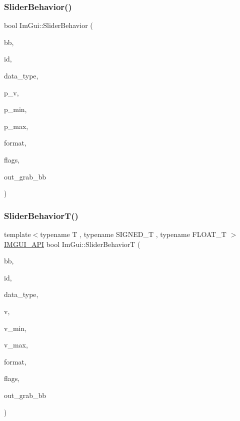 \mbox{\label{namespaceImGui_af8d5d2cfa55221448e55e51b1abcfe93}} 
\subsubsection{\texorpdfstring{Slider\+Behavior()}{SliderBehavior()}}
{\footnotesize\ttfamily bool Im\+Gui\+::\+Slider\+Behavior (\begin{DoxyParamCaption}\item[{const \hyperlink{structImRect}{Im\+Rect} \&}]{bb,  }\item[{Im\+Gui\+ID}]{id,  }\item[{Im\+Gui\+Data\+Type}]{data\+\_\+type,  }\item[{\hyperlink{imgui__impl__opengl3__loader_8h_ac668e7cffd9e2e9cfee428b9b2f34fa7}{void} $\ast$}]{p\+\_\+v,  }\item[{const \hyperlink{imgui__impl__opengl3__loader_8h_ac668e7cffd9e2e9cfee428b9b2f34fa7}{void} $\ast$}]{p\+\_\+min,  }\item[{const \hyperlink{imgui__impl__opengl3__loader_8h_ac668e7cffd9e2e9cfee428b9b2f34fa7}{void} $\ast$}]{p\+\_\+max,  }\item[{const char $\ast$}]{format,  }\item[{Im\+Gui\+Slider\+Flags}]{flags,  }\item[{\hyperlink{structImRect}{Im\+Rect} $\ast$}]{out\+\_\+grab\+\_\+bb }\end{DoxyParamCaption})}

\mbox{\label{namespaceImGui_ad0247a8c67e80cc038c1918ef3a75b80}} 
\subsubsection{\texorpdfstring{Slider\+Behavior\+T()}{SliderBehaviorT()}}
{\footnotesize\ttfamily template$<$typename T , typename S\+I\+G\+N\+E\+D\+\_\+T , typename F\+L\+O\+A\+T\+\_\+T $>$ \\
\hyperlink{imgui_8h_a43829975e84e45d1149597467a14bbf5}{I\+M\+G\+U\+I\+\_\+\+A\+PI} bool Im\+Gui\+::\+Slider\+BehaviorT (\begin{DoxyParamCaption}\item[{const \hyperlink{structImRect}{Im\+Rect} \&}]{bb,  }\item[{Im\+Gui\+ID}]{id,  }\item[{Im\+Gui\+Data\+Type}]{data\+\_\+type,  }\item[{T $\ast$}]{v,  }\item[{T}]{v\+\_\+min,  }\item[{T}]{v\+\_\+max,  }\item[{const char $\ast$}]{format,  }\item[{Im\+Gui\+Slider\+Flags}]{flags,  }\item[{\hyperlink{structImRect}{Im\+Rect} $\ast$}]{out\+\_\+grab\+\_\+bb }\end{DoxyParamCaption})}

